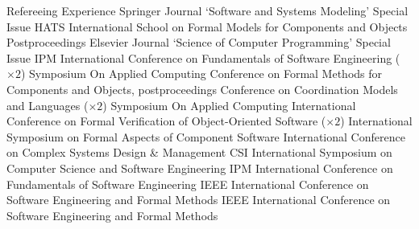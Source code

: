 
\begin{rubric}{Refereeing Experience}
		Springer Journal `Software and Systems Modeling' Special Issue
		HATS International School on Formal Models for Components and Objects Postproceedings
		Elsevier Journal `Science of Computer Programming' Special Issue
		 IPM International Conference on Fundamentals of Software Engineering ($\times 2$)
		 Symposium On Applied Computing
		 Conference on Formal Methods for Components and Objects, postproceedings
		 Conference on Coordination Models and Languages ($\times 2$)
		 Symposium On Applied Computing
		 International Conference on Formal Verification of Object-Oriented Software ($\times 2$)
		 International Symposium on Formal Aspects of Component Software
		 International Conference on Complex Systems Design \& Management
		 CSI International Symposium on Computer Science and Software Engineering
		 IPM International Conference on Fundamentals of Software Engineering
		 IEEE International Conference on Software Engineering and Formal Methods
		 IEEE International Conference on Software Engineering and Formal Methods
\end{rubric}
